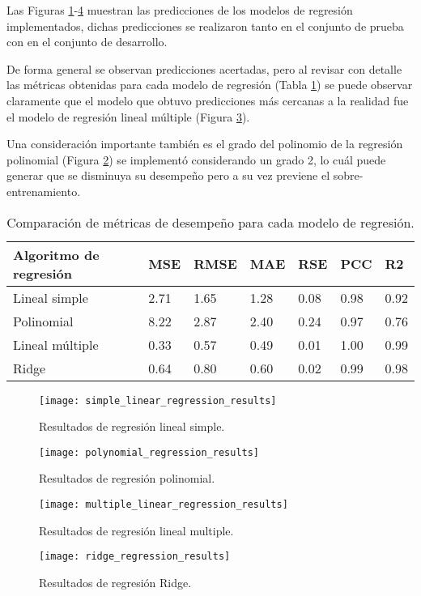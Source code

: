 Las Figuras \ref{Fig: simple}-\ref{Fig: ridge} muestran las predicciones de los modelos de regresión implementados, dichas predicciones se realizaron tanto en el conjunto de prueba con en el conjunto de desarrollo.

De forma general se observan predicciones acertadas, pero al revisar con detalle las métricas obtenidas para cada modelo de regresión (Tabla \ref{Tab: results}) se puede observar claramente que el modelo que obtuvo predicciones más cercanas a la realidad fue el modelo de regresión lineal múltiple (Figura \ref{Fig: multiple}).

Una consideración importante también es el grado del polinomio de la regresión polinomial (Figura \ref{Fig: polinomial}) se implementó considerando un grado 2, lo cuál puede generar que se disminuya su desempeño pero a su vez previene el sobre-entrenamiento.

\begin{table}[H]
\centering
\caption{Comparación de métricas de desempeño para cada modelo de regresión.}
\begin{tabular}{@{}lllllll@{}}
\toprule
Algoritmo de regresión & MSE  & RMSE & MAE  & RSE  & PCC  & R2   \\ \midrule
Lineal simple          & 2.71 & 1.65 & 1.28 & 0.08 & 0.98 & 0.92 \\
Polinomial             & 8.22 & 2.87 & 2.40 & 0.24 & 0.97 & 0.76 \\
Lineal múltiple        & 0.33 & 0.57 & 0.49 & 0.01 & 1.00 & 0.99 \\
Ridge                  & 0.64 & 0.80 & 0.60 & 0.02 & 0.99 & 0.98 \\ \bottomrule
\end{tabular}
\label{Tab: results}
\end{table}

\newpage

\begin{figure}[t]
	\centering
	\texttt{[image: simple\_linear\_regression\_results]}
	\caption{Resultados de regresión lineal simple.}
	\label{Fig: simple}
\end{figure}

\begin{figure}[b]
	\centering
	\texttt{[image: polynomial\_regression\_results]}
	\caption{Resultados de regresión polinomial.}
	\label{Fig: polinomial}
\end{figure}

\begin{figure}[b]
	\centering
	\texttt{[image: multiple\_linear\_regression\_results]}
	\caption{Resultados de regresión lineal multiple.}
	\label{Fig: multiple}
\end{figure}

\begin{figure}[t]
	\centering
	\texttt{[image: ridge\_regression\_results]}
	\caption{Resultados de regresión Ridge.}
	\label{Fig: ridge}
\end{figure}
